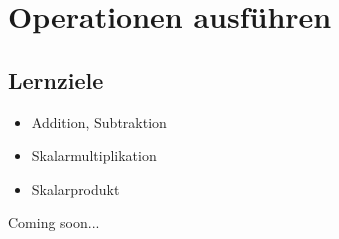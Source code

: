 \section{Operationen ausführen}

\subsection*{Lernziele}
\begin{itemize}
\item Addition, Subtraktion
\item Skalarmultiplikation
\item Skalarprodukt
\end{itemize}


Coming soon...
